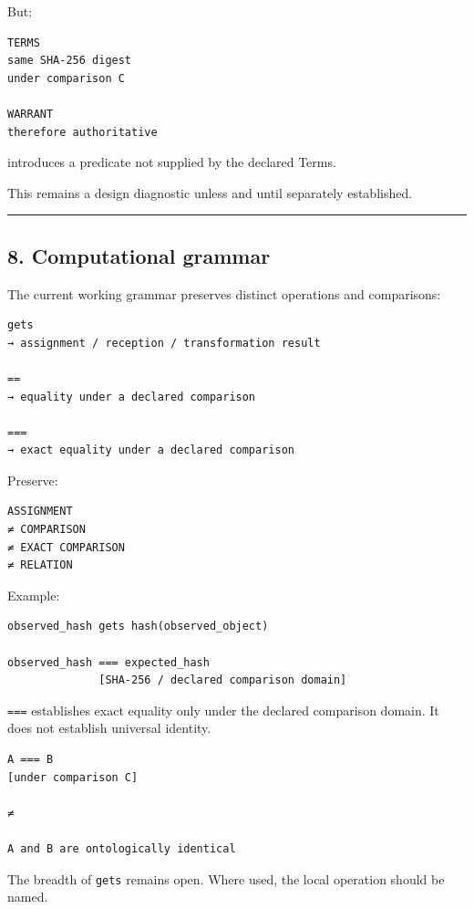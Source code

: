 But:

\begin{verbatim}
TERMS
same SHA-256 digest
under comparison C

WARRANT
therefore authoritative
\end{verbatim}

introduces a predicate not supplied by the declared Terms.

This remains a design diagnostic unless and until separately
established.

\begin{center}\rule{0.5\linewidth}{0.5pt}\end{center}

\subsection{8. Computational grammar}\label{computational-grammar}

The current working grammar preserves distinct operations and
comparisons:

\begin{verbatim}
gets
→ assignment / reception / transformation result

==
→ equality under a declared comparison

===
→ exact equality under a declared comparison
\end{verbatim}

Preserve:

\begin{verbatim}
ASSIGNMENT
≠ COMPARISON
≠ EXACT COMPARISON
≠ RELATION
\end{verbatim}

Example:

\begin{verbatim}
observed_hash gets hash(observed_object)

observed_hash === expected_hash
              [SHA-256 / declared comparison domain]
\end{verbatim}

\texttt{===} establishes exact equality only under the declared
comparison domain. It does not establish universal identity.

\begin{verbatim}
A === B
[under comparison C]

≠

A and B are ontologically identical
\end{verbatim}

The breadth of \texttt{gets} remains open. Where used, the local
operation should be named.

